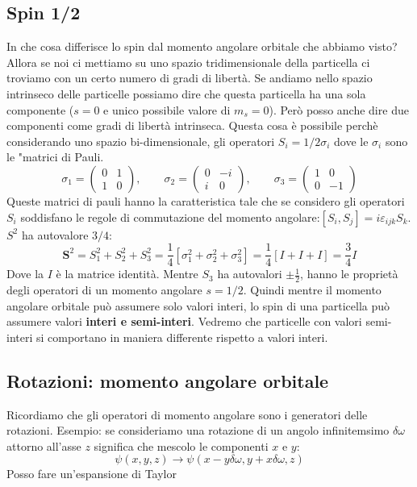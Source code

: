 \subsection{Spin 1/2}
In che cosa differisce lo spin dal momento angolare orbitale che abbiamo visto? Allora se noi ci mettiamo su uno spazio tridimensionale della particella ci troviamo con un certo numero di gradi di libertà. Se andiamo nello spazio intrinseco delle particelle possiamo dire che questa particella ha una sola componente ($s=0$ e unico possibile valore di $m_s=0$). Però posso anche dire due componenti come gradi di libertà intrinseca. Questa cosa è possibile perchè considerando uno spazio bi-dimensionale, gli operatori $S_i=1/2\sigma_i$ dove le $\sigma_i$ sono le "matrici di Pauli.
\begin{equation*}
    \sigma_1 =
\begin{pmatrix}0&1\\1&0\end{pmatrix}, \qquad \sigma_2 =
\begin{pmatrix}0&-i\\i&0\end{pmatrix} ,\qquad \sigma_3 =
\begin{pmatrix}1&0\\0&-1\end{pmatrix} 
\end{equation*}
Queste matrici di pauli hanno la caratteristica tale che se considero gli operatori $S_i$ soddisfano le regole di commutazione del momento angolare:$[S_i,S_j]=i\varepsilon_{ijk}S_k$. $S^2$ ha autovalore $3/4$:
\begin{equation*}
    \mathbf{S}^2=S_1^2+S_2^2+S_3^2=\frac{1}{4}[\sigma^2_1+\sigma^2_2+\sigma^2_3]=\frac{1}{4}[I+I+I]=\frac{3}{4}I
\end{equation*} 
Dove la $I$ è la matrice identità. Mentre $S_3$ ha autovalori $\pm\frac{1}{2}$, hanno le proprietà degli operatori di un momento angolare $s=1/2$. Quindi mentre il momento angolare orbitale può assumere solo valori interi, lo spin di una particella può assumere valori \textbf{interi e semi-interi}. Vedremo che particelle con valori semi-interi si comportano in maniera differente rispetto a valori interi.
\subsection{Rotazioni: momento angolare orbitale}
 Ricordiamo che gli operatori di momento angolare sono i generatori delle rotazioni. Esempio: se consideriamo una rotazione di un angolo infinitemsimo $\delta \omega$ attorno all'asse $z$ significa che mescolo le componenti $x$ e $y$:
 \begin{equation*}
     \psi(x,y,z)\to\psi(x-y\delta \omega,y+x\delta \omega,z)
 \end{equation*}
 Posso fare un'espansione di Taylor

